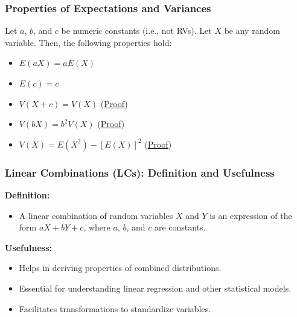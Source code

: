\documentclass[handout]{beamer} %
\begin{document}
\begin{frame} %
\frametitle{Properties of Expectations and Variances}

Let $a$, $b$, and $c$ be numeric constants (i.e., not RVs). Let $X$ be any random variable. Then, the following properties hold:

\vspace{1em}
\begin{itemize}
    \item $E(aX) = aE(X)$
  \pause
    \item $E(c) = c$
  \pause
    \item $V(X + c) = V(X)$  \hspace{6.0em} (\href{https://statproofbook.github.io/P/var-inv}{Proof}) 
  \pause
    \item $V(bX) = b^2 V(X)$ \hspace{6.2em} (\href{https://statproofbook.github.io/P/var-scal}{Proof})  
  \pause
    \item $V(X) = E(X^2) - [E(X)]^2 $ \hspace{2.9em} (\href{https://statproofbook.github.io/P/var-mean}{Proof})
\end{itemize}

\end{frame}

\begin{frame} %
\frametitle{Linear Combinations (LCs): Definition and Usefulness}

\textbf{Definition:}
\begin{itemize}
    \item A linear combination of random variables $X$ and $Y$ is an expression of the form $aX + bY + c$, where $a$, $b$, and $c$ are constants.
\end{itemize}
  \pause

\textbf{Usefulness:}
\begin{itemize}
    \item Helps in deriving properties of combined distributions.
  \pause
    \item Essential for understanding linear regression and other statistical models.
  \pause
    \item Facilitates transformations to standardize variables.
\end{itemize}

\end{frame}
\end{document}
